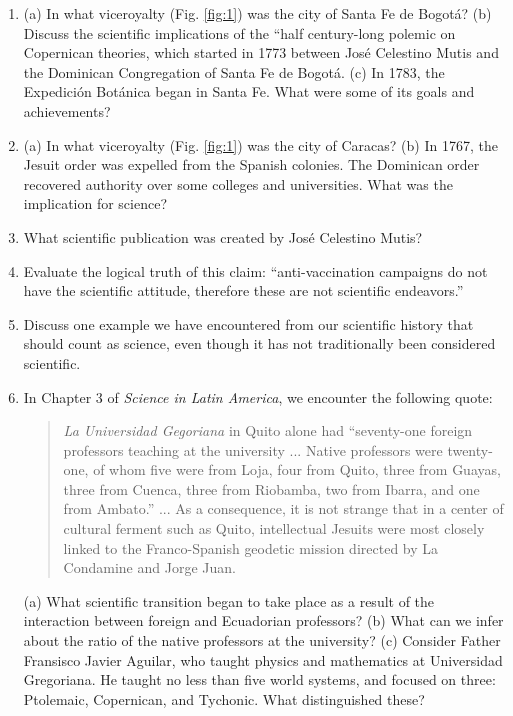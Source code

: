 \documentclass[10pt]{article}
\begin{document}
\begin{enumerate}
\item (a) In what viceroyalty (Fig. \ref{fig:1}) was the city of Santa Fe de Bogot\'{a}? (b) Discuss the scientific implications of the ``half century-long polemic on Copernican theories, which started in 1773 between Jos\'{e} Celestino Mutis and the Dominican Congregation of Santa Fe de Bogot\'{a}. (c) In 1783, the Expedici\'{o}n Bot\'{a}nica began in Santa Fe.  What were some of its goals and achievements? \\ \vspace{2cm}
\item (a) In what viceroyalty (Fig. \ref{fig:1}) was the city of Caracas? (b) In 1767, the Jesuit order was expelled from the Spanish colonies.  The Dominican order recovered authority over some colleges and universities.  What was the implication for science? \\ \vspace{2cm}
\item What scientific publication was created by Jos\'{e} Celestino Mutis? \\ \vspace{0.5cm}
\item Evaluate the logical truth of this claim: ``anti-vaccination campaigns do not have the scientific attitude, therefore these are not scientific endeavors.'' \\ \vspace{1cm}
\item Discuss one example we have encountered from our scientific history that should count as science, even though it has not traditionally been considered scientific. \\ \vspace{1cm}
\item In Chapter 3 of \textit{Science in Latin America}, we encounter the following quote:
\begin{quotation}
\textit{La Universidad Gegoriana} in Quito alone had ``seventy-one foreign professors teaching at the university ... Native professors were twenty-one, of whom five were from Loja, four from Quito, three from Guayas, three from Cuenca, three from Riobamba, two from Ibarra, and one from Ambato.'' ... As a consequence, it is not strange that in a center of cultural ferment such as Quito, intellectual Jesuits were most closely linked to the Franco-Spanish geodetic mission directed by La Condamine and Jorge Juan.
\end{quotation}
(a) What scientific transition began to take place as a result of the interaction between foreign and Ecuadorian professors? (b) What can we infer about the ratio of the native professors at the university? (c) Consider Father Fransisco Javier Aguilar, who taught physics and mathematics at Universidad Gregoriana.  He taught no less than five world systems, and focused on three: Ptolemaic, Copernican, and Tychonic.  What distinguished these? \\ \vspace{1cm}

\end{enumerate}
\end{document}
